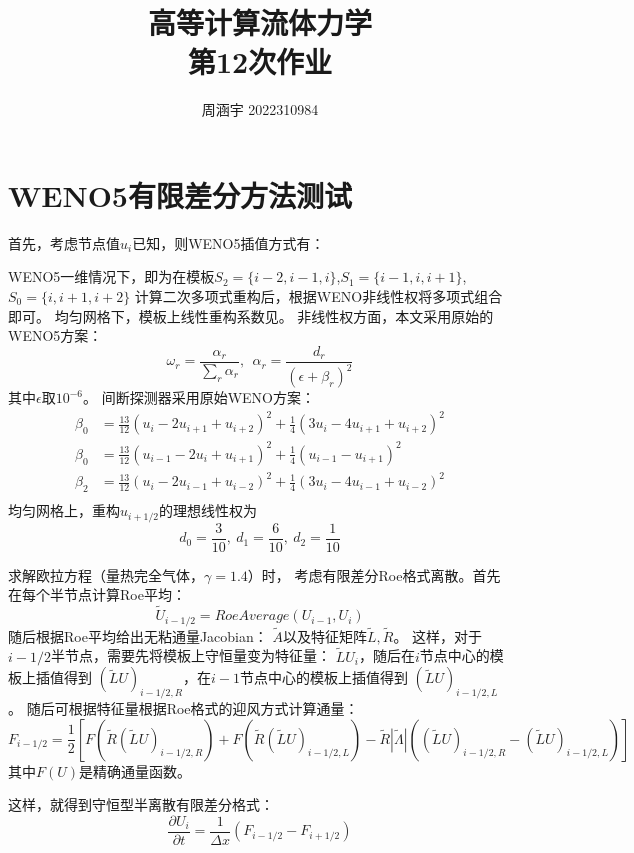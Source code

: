 \documentclass[UTF8,zihao=5]{ctexart} %
\title{{\bfseries\rmfamily\Huge{高等计算流体力学\hspace{1em}\\第12次作业}}}
\author{周涵宇 2022310984}
\date{}
\newcommand*{\pd}[2]{\frac{\partial #1}{\partial #2}}
\newcommand*{\inc}[0]{{\Delta}}
\newcommand*{\mean}[1]{{#1}}
\begin{document}
\maketitle

\section{WENO5有限差分方法测试}

首先，考虑节点值$\mean{u}_i$已知，则WENO5插值方式有：

WENO5一维情况下，即为在模板$S_2=\{i-2,i-1,i\}$,$S_1=\{i-1,i,i+1\}$,$S_0=\{i,i+1,i+2\}$
计算二次多项式重构后，根据WENO非线性权将多项式组合即可。
均匀网格下，模板上线性重构系数见\cite{cockburn1998essentially}。
非线性权方面，本文采用原始的WENO5方案：
$$
    \omega_r = \frac{\alpha_r}{\sum_r{\alpha_r}},\ \ \alpha_r = \frac{d_r}{(\epsilon+\beta_r)^2}
$$
其中$\epsilon$取$10^{-6}$。
间断探测器采用原始WENO方案\cite{cockburn1998essentially}：
$$
    \begin{aligned}
        \beta_0 & =
        \frac{13}{12}(\mean{u}_{i}-2\mean{u}_{i+1}+\mean{u}_{i+2})^2 +
        \frac{1}{4}(3\mean{u}_{i}-4\mean{u}_{i+1}+\mean{u}_{i+2})^2 \\
        \beta_0 & =
        \frac{13}{12}(\mean{u}_{i-1}-2\mean{u}_{i}+\mean{u}_{i+1})^2 +
        \frac{1}{4}(\mean{u}_{i-1}-\mean{u}_{i+1})^2                \\
        \beta_2 & =
        \frac{13}{12}(\mean{u}_{i}-2\mean{u}_{i-1}+\mean{u}_{i-2})^2 +
        \frac{1}{4}(3\mean{u}_{i}-4\mean{u}_{i-1}+\mean{u}_{i-2})^2 \\
    \end{aligned}
$$
均匀网格上，重构$u_{i+1/2}$的理想线性权为
$$
    d_0 = \frac{3}{10},\ d_1=\frac{6}{10},\ d_2 = \frac{1}{10}
$$

求解欧拉方程（量热完全气体，$\gamma=1.4$）时，
考虑有限差分Roe格式离散。首先在每个半节点计算Roe平均：
$$
\tilde{U}_{i-1/2} = RoeAverage(U_{i-1},U_i)
$$
随后根据Roe平均给出无粘通量Jacobian：
$\tilde{A}$以及特征矩阵$\tilde{L},\tilde{R}$。
这样，对于$i-1/2$半节点，需要先将模板上守恒量变为特征量：
$\tilde{L}U_i$，随后在$i$节点中心的模板上插值得到
$(\tilde{L}U)_{i-1/2,R}$，在$i-1$节点中心的模板上插值得到
$(\tilde{L}U)_{i-1/2,L}$。
随后可根据特征量根据Roe格式的迎风方式计算通量：
$$
F_{i-1/2} =\frac{1}{2} \left[F(\tilde{R}(\tilde{L}U)_{i-1/2,R})
+F(\tilde{R}(\tilde{L}U)_{i-1/2,L})
-\tilde{R} |\tilde{\Lambda}| ((\tilde{L}U)_{i-1/2,R}-(\tilde{L}U)_{i-1/2,L})
\right]
$$
其中$F(U)$是精确通量函数。

这样，就得到守恒型半离散有限差分格式：
$$
\pd{U_i}{t} = \frac{1}{\inc x} (F_{i-1/2} - F_{i+1/2})
$$
\end{document}
